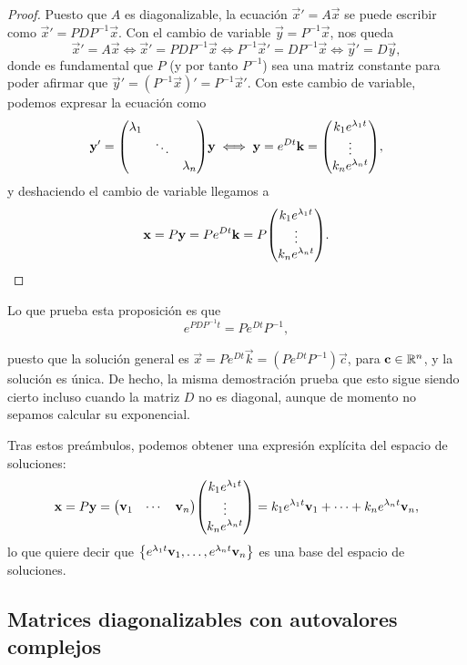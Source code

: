 \documentclass[../ecuaciones_diferenciales.tex]{subfiles}
\begin{document}
\begin{proof}
	Puesto que \(A\) es diagonalizable, la ecuación \(\vec{x}' = A\vec{x}\) 
	se puede escribir como
	\(\vec{x}' = P D P^{-1} \vec{x}\). Con el cambio de variable 
	\(\vec{y} = P^{-1}\vec{x}\), nos queda
	\[\vec{x}' = A\vec{x} \iff 
		\vec{x}' = PDP^{-1}\vec{x} \iff 
		P^{-1}\vec{x}' = DP^{-1}\vec{x} \iff \vec{y}' = D\vec{y},\]
	donde es fundamental que \(P\) (y por tanto \(P^{-1}\)) sea una matriz constante
	para poder afirmar que \(\vec{y}' = (P^{-1}\vec{x})' = P^{-1}\vec{x}'\). 
	Con este cambio de variable, podemos expresar la ecuación como
	\[\vec{y}' = \mat{\lambda_1 && \\ & \ddots & \\ && \lambda_n} \vec{y} \iff
		\vec{y} = e^{Dt}\vec{k} 
		= \mat{k_1 e^{\lambda_1 t} \\ \vdots \\ k_n e^{\lambda_n t}},\]
    y deshaciendo el cambio de variable llegamos a
    \[\vec{x} = P \vec{y} = P e^{Dt}\vec{k}= P \mat{k_1 e^{\lambda_1 t} \\ \vdots \\ k_n
          e^{\lambda_n t}}.\]
\end{proof}

\begin{remark}
    Lo que prueba esta proposición es que
    \[e^{PDP^{-1}t} = P e^{Dt} P^{-1},\]

    puesto que la solución general es
    \(\vec{x} = P e^{Dt} \vec{k} = \left( P e^{Dt} P^{-1} \right) \vec{c}\),
    para \(\mathbf{c} \in \mathbb{R}^n\), y la solución es única. De hecho, la misma
    demostración prueba que esto sigue siendo cierto incluso cuando la matriz
    \(D\) no es diagonal, aunque de momento no sepamos calcular su exponencial.
\end{remark}

Tras estos preámbulos, podemos obtener una expresión explícita del espacio de
soluciones:
\[
	\vec{x} = P\vec{y} = \mat{\vec{v}_1 & \cdots & \vec{v}_n} 
		\mat{k_1 e^{\lambda_1 t} \\ \vdots \\ k_n e^{\lambda_n t}} =
	k_1 e^{\lambda_1 t} \vec{v}_1 + \cdots + k_n e^{\lambda_n t}\vec{v}_n,
\]
lo que quiere decir que \(\set{e^{\lambda_1 t} \vec{v}_1, \dots, e^{\lambda_n t} \vec{v}_n}\) es una base del espacio de soluciones.

\subsection{Matrices diagonalizables con autovalores complejos}
\end{document}
